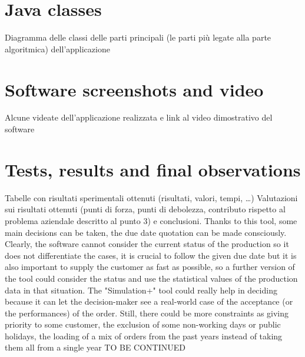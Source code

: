 \documentclass[a4paper,12pt]{article}
\begin{document}
\newpage
\section{Java classes}
Diagramma delle classi delle parti principali (le parti più legate alla parte algoritmica) dell’applicazione

\newpage
\section{Software screenshots and video}
Alcune videate dell’applicazione realizzata e link al video dimostrativo del software

\newpage
\section{Tests, results and final observations}
Tabelle con risultati sperimentali ottenuti (risultati, valori, tempi, …)
Valutazioni sui risultati ottenuti (punti di forza, punti di debolezza, contributo rispetto al problema aziendale descritto al punto 3) e conclusioni.
Thanks to this tool, some main decisions can be taken, the due date quotation can be made consciously. Clearly, the software cannot consider the current status of the production so it does not differentiate the cases, it is crucial to follow the given due date but it is also important to supply the customer as fast as possible, so a further version of the tool could consider the status and use the statistical values of the production data in that situation. The "Simulation+" tool could really help in deciding because it can let the decision-maker see a real-world case of the acceptance (or the performances) of the order. Still, there could be more constraints as giving priority to some customer, the exclusion of some non-working days or public holidays, the loading of a mix of orders from the past years instead of taking them all from a single year TO BE CONTINUED
\end{document}
